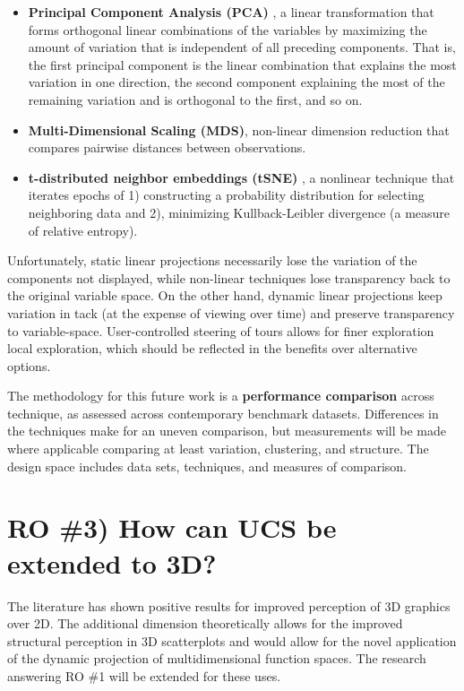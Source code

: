 \documentclass{monashthesis}
\begin{document}
\begin{itemize}
\tightlist
\item
  \textbf{Principal Component Analysis (PCA)}
  \autocite{pearson_liii._1901}, a linear transformation that forms
  orthogonal linear combinations of the variables by maximizing the
  amount of variation that is independent of all preceding components.
  That is, the first principal component is the linear combination that
  explains the most variation in one direction, the second component
  explaining the most of the remaining variation and is orthogonal to
  the first, and so on.
\item
  \textbf{Multi-Dimensional Scaling (MDS)}, non-linear dimension
  reduction that compares pairwise distances between observations.
\item
  \textbf{t-distributed neighbor embeddings (tSNE)}
  \autocite{maaten_visualizing_2008}, a nonlinear technique that
  iterates epochs of 1) constructing a probability distribution for
  selecting neighboring data and 2), minimizing Kullback-Leibler
  divergence (a measure of relative entropy).
\end{itemize}

Unfortunately, static linear projections necessarily lose the variation
of the components not displayed, while non-linear techniques lose
transparency back to the original variable space. On the other hand,
dynamic linear projections keep variation in tack (at the expense of
viewing over time) and preserve transparency to variable-space.
User-controlled steering of tours allows for finer exploration local
exploration, which should be reflected in the benefits over alternative
options.

The methodology for this future work is a \textbf{performance
comparison} across technique, as assessed across contemporary benchmark
datasets. Differences in the techniques make for an uneven comparison,
but measurements will be made where applicable comparing at least
variation, clustering, and structure. The design space includes data
sets, techniques, and measures of comparison.

\section{RO \#3) How can UCS be extended to
3D?}\label{ro-3-how-can-ucs-be-extended-to-3d}

The literature has shown positive results for improved perception of 3D
graphics over 2D. The additional dimension theoretically allows for the
improved structural perception in 3D scatterplots and would allow for
the novel application of the dynamic projection of multidimensional
function spaces. The research answering RO \#1 will be extended for
these uses.
\end{document}
